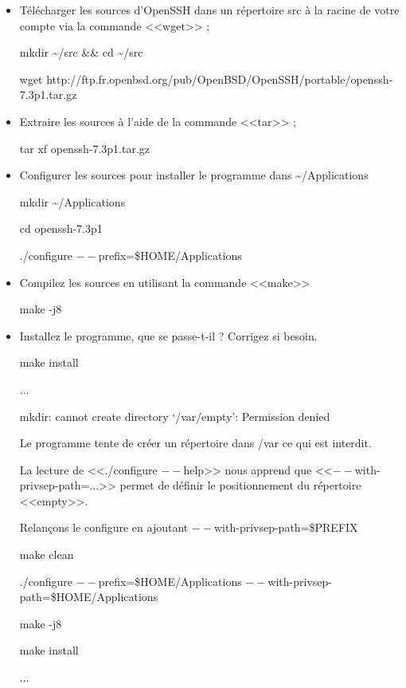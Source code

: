 \documentclass[11pt]{article}
\begin{document}
\begin{itemize}
 \item Télécharger les sources d'OpenSSH dans un répertoire src à la racine de votre compte via la commande <<wget>> ;
\begin{solution}

 mkdir \textasciitilde{}/src \&\& cd \textasciitilde{}/src

 wget http://ftp.fr.openbsd.org/pub/OpenBSD/OpenSSH/portable/openssh-7.3p1.tar.gz
\end{solution}
 \item Extraire les sources à l'aide de la commande <<tar>> ;
\begin{solution}
 tar xf openssh-7.3p1.tar.gz
\end{solution}
 \item Configurer les sources pour installer le programme dans \textasciitilde{}/Applications
\begin{solution}

 mkdir \textasciitilde{}/Applications

 cd openssh-7.3p1

 ./configure $--$prefix=\$HOME/Applications
\end{solution}
 \item Compilez les sources en utilisant la commande <<make>>
\begin{solution}
 make -j8
\end{solution}
 \item Installez le programme, que se passe-t-il ? Corrigez si besoin.
\begin{solution}

make install

...

mkdir: cannot create directory ‘/var/empty’: Permission denied

Le programme tente de créer un répertoire dans /var ce qui est interdit.

La lecture de <<./configure $--$help>> nous apprend que <<$--$with-privsep-path=...>> permet de définir le positionnement du répertoire <<empty>>.

Relançons le configure en ajoutant $--$with-privsep-path=\$PREFIX

make clean

./configure $--$prefix=\$HOME/Applications $--$with-privsep-path=\$HOME/Applications

make -j8

make install

...


\end{solution}
\end{itemize}
\end{document}
